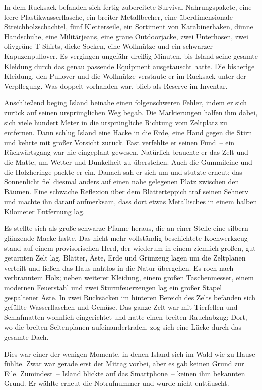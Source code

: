 In dem Rucksack befanden sich fertig zubereitete Survival-Nahrungspakete, eine leere Plastikwasserflasche, ein breiter Metallbecher, eine überdimensionale Streichholzschachtel, fünf Kletterseile, ein Sortiment von Karabinerhaken, dünne Handschuhe, eine Militärjeans, eine graue Outdoorjacke, zwei Unterhosen, zwei olivgrüne T-Shirts, dicke Socken, eine Wollmütze und ein schwarzer Kapuzenpullover. Es vergingen ungefähr dreißig Minuten, bis Island seine gesamte Kleidung durch das genau passende Equipment ausgetauscht hatte. Die bisherige Kleidung, den Pullover und die Wollmütze verstaute er im Rucksack unter der Verpflegung. Was doppelt vorhanden war, blieb als Reserve im Inventar.

Anschließend beging Island beinahe einen folgenschweren Fehler, indem er sich zurück auf seinen ursprünglichen Weg begab. Die Markierungen halfen ihm dabei, sich viele hundert Meter in die ursprüngliche Richtung vom Zeltplatz zu entfernen. Dann schlug Island eine Hacke in die Erde, eine Hand gegen die Stirn und kehrte mit großer Vorsicht zurück. Fast verfehlte er seinen Fund~– ein Rückwärtsgang war nie eingeplant gewesen. Natürlich brauchte er das Zelt und die Matte, um Wetter und Dunkelheit zu überstehen. Auch die Gummileine und die Holzheringe packte er ein. Danach sah er sich um und stutzte erneut; das Sonnenlicht fiel diesmal anders auf einen nahe gelegenen Platz zwischen den Bäumen. Eine schwache Reflexion über dem Blätterteppich traf seinen Sehnerv und machte ihn darauf aufmerksam, dass dort etwas Metallisches in einem halben Kilometer Entfernung lag.

Es stellte sich als große schwarze Pfanne heraus, die an einer Stelle eine silbern glänzende Macke hatte. Das nicht mehr vollständig beschichtete Kochwerkzeug stand auf einem provisorischen Herd, der wiederum in einem ziemlich großen, gut getarnten Zelt lag. Blätter, Äste, Erde und Grünzeug lagen um die Zeltplanen verteilt und ließen das Haus nahtlos in die Natur übergehen. Es roch nach verbranntem Holz; neben weiterer Kleidung, einem großen Taschenmesser, einem modernen Feuerstahl und zwei Sturmfeuerzeugen lag ein großer Stapel gespaltener Äste. In zwei Rucksäcken im hinteren Bereich des Zelts befanden sich gefüllte Wasserflaschen und Gemüse. Das ganze Zelt war mit Tierfellen und Schlafmatten wohnlich eingerichtet und hatte einen breiten Rauchabzug: Dort, wo die breiten Seitenplanen aufeinandertrafen, zog sich eine Lücke durch das gesamte Dach.

Dies war einer der wenigen Momente, in denen Island sich im Wald wie zu Hause fühlte. Zwar war gerade erst der Mittag vorbei, aber es gab keinen Grund zur Eile. Zumindest~– Island blickte auf das Smartphone~– keinen ihm bekannten Grund. Er wählte erneut die Notrufnummer und wurde nicht enttäuscht.

